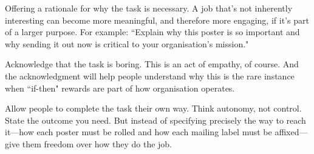 \begin{compactitem}
\item Offering a rationale for why the task is necessary. A job that’s not inherently interesting can become more meaningful, and therefore more engaging, if it’s part of a larger purpose. For example: ``Explain why this poster is so important and why sending it out now is critical to your organisation’s mission."
\item Acknowledge that the task is boring. This is an act of empathy, of course. And the acknowledgment will help people understand why this is the rare instance when ``if-then" rewards are part of how organisation operates.
\item Allow people to complete the task their own way. Think autonomy, not control. State the outcome you need. But instead of specifying precisely the way to reach it—how each poster must be rolled and how each mailing label must be affixed—give them freedom over how they do the job.
\end{compactitem}

